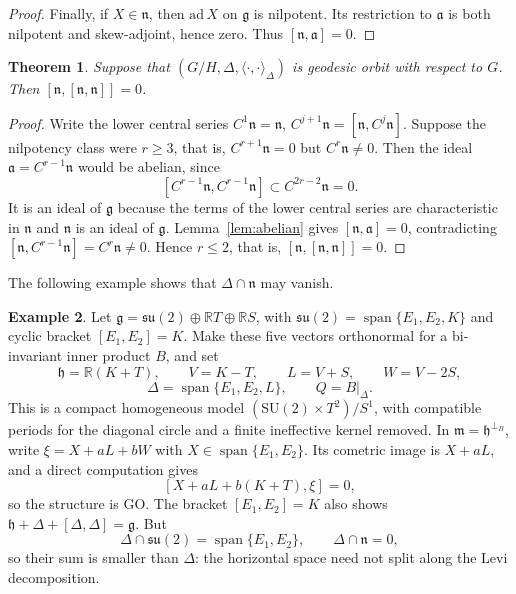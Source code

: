 \documentclass[12pt]{amsart}
\theoremstyle{plain}
\newtheorem{theorem}{Theorem}[section]
\theoremstyle{definition}
\newtheorem{example}[theorem]{Example}
\theoremstyle{remark}
\newcommand{\alg}[1]{\mathfrak{#1}}
\newcommand{\RR}{\mathbb{R}}
\begin{document}
\begin{proof}
Finally, if $X\in\alg{n}$, then $\mathrm{ad}\,X$ on $\alg{g}$ is nilpotent. Its restriction to
$\alg{a}$ is both nilpotent and skew-adjoint, hence zero. Thus $[\alg{n},\alg{a}]=0$.
\end{proof}

\begin{theorem}\label{thm:nilradical}
Suppose that $(G/H,\Delta,\langle\cdot,\cdot\rangle_\Delta)$ is geodesic orbit with respect to
$G$. Then $[\alg{n},[\alg{n},\alg{n}]]=0$.
\end{theorem}

\begin{proof}
Write the lower central series $C^1\alg{n}=\alg{n}$, $C^{j+1}\alg{n}=[\alg{n},C^j\alg{n}]$.
Suppose the nilpotency class were $r\ge3$, that is, $C^{r+1}\alg{n}=0$ but $C^r\alg{n}\neq0$.
Then the ideal $\alg{a}=C^{r-1}\alg{n}$ would be abelian, since
\[ [C^{r-1}\alg{n},C^{r-1}\alg{n}]\subset C^{2r-2}\alg{n}=0. \]
It is an ideal of $\alg{g}$ because the terms of the lower central series are characteristic in
$\alg{n}$ and $\alg{n}$ is an ideal of $\alg{g}$. Lemma~\ref{lem:abelian} gives
$[\alg{n},\alg{a}]=0$, contradicting $[\alg{n},C^{r-1}\alg{n}]=C^r\alg{n}\neq0$. Hence $r\le2$,
that is, $[\alg{n},[\alg{n},\alg{n}]]=0$.
\end{proof}

The following example shows that $\Delta\cap\alg{n}$ may vanish.

\begin{example}\label{ex:su2}
Let $\alg{g}=\alg{su}(2)\oplus\RR T\oplus\RR S$, with
$\alg{su}(2)=\operatorname{span}\{E_1,E_2,K\}$ and cyclic bracket $[E_1,E_2]=K$. Make these five
vectors orthonormal for a bi-invariant inner product $B$, and set
\[ \alg{h}=\RR(K+T),\qquad V=K-T,\qquad L=V+S,\qquad W=V-2S, \]
\[ \Delta=\operatorname{span}\{E_1,E_2,L\},\qquad Q=B|_{\Delta}. \]
This is a compact homogeneous model $(\mathrm{SU}(2)\times T^2)/S^1$, with compatible periods for
the diagonal circle and a finite ineffective kernel removed. In $\alg{m}=\alg{h}^{\perp_B}$,
write $\xi=X+aL+bW$ with $X\in\operatorname{span}\{E_1,E_2\}$. Its cometric image is $X+aL$, and a
direct computation gives
\[ [X+aL+b(K+T),\xi]=0, \]
so the structure is GO. The bracket $[E_1,E_2]=K$ also shows
$\alg{h}+\Delta+[\Delta,\Delta]=\alg{g}$. But
\[ \Delta\cap\alg{su}(2)=\operatorname{span}\{E_1,E_2\},\qquad \Delta\cap\alg{n}=0, \]
so their sum is smaller than $\Delta$: the horizontal space need not split along the Levi
decomposition.
\end{example}
\end{document}
